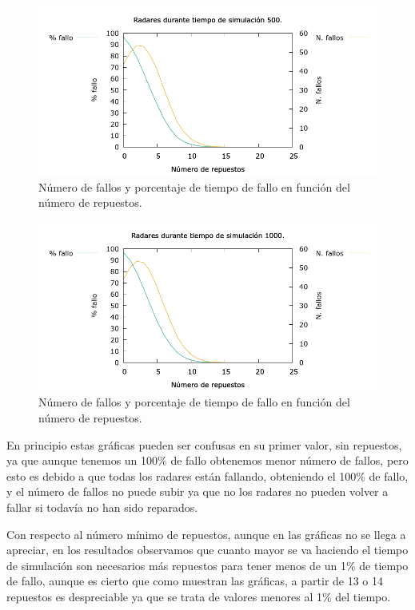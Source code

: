 \documentclass[12pt, spanish]{article}
\begin{document}
\begin{figure}[H]
	\centering
	\includegraphics[scale = 0.6]{radares_500.png}
	\caption{Número de fallos y porcentaje de tiempo de fallo en función del número de repuestos.}
	\label{fig:ej4}
\end{figure}

\begin{figure}[H]
	\centering
	\includegraphics[scale = 0.6]{radares_1000.png}
	\caption{Número de fallos y porcentaje de tiempo de fallo en función del número de repuestos.}
	\label{fig:ej4}
\end{figure}


En principio estas gráficas pueden ser confusas en su primer valor, sin repuestos, ya que aunque tenemos un 100\% de fallo obtenemos menor número de fallos, pero esto es debido a que todas los radares están fallando, obteniendo el 100\% de fallo, y el número de fallos no puede subir ya que no los radares no pueden volver a fallar si todavía no han sido reparados.

Con respecto al número mínimo de repuestos, aunque en las gráficas no se llega a apreciar, en los resultados observamos que cuanto mayor se va haciendo el tiempo de simulación son necesarios más repuestos para tener menos de un 1\% de tiempo de fallo, aunque es cierto que como muestran las gráficas, a partir de 13 o 14 repuestos es despreciable ya que se trata de valores menores al 1\% del tiempo.
\end{document}
